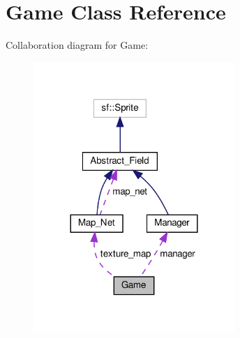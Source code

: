 \section{Game Class Reference}
\label{class_game}


Collaboration diagram for Game\+:
\nopagebreak
\begin{figure}[H]
\begin{center}
\leavevmode
\includegraphics[width=216pt]{class_game__coll__graph}
\end{center}
\end{figure}
